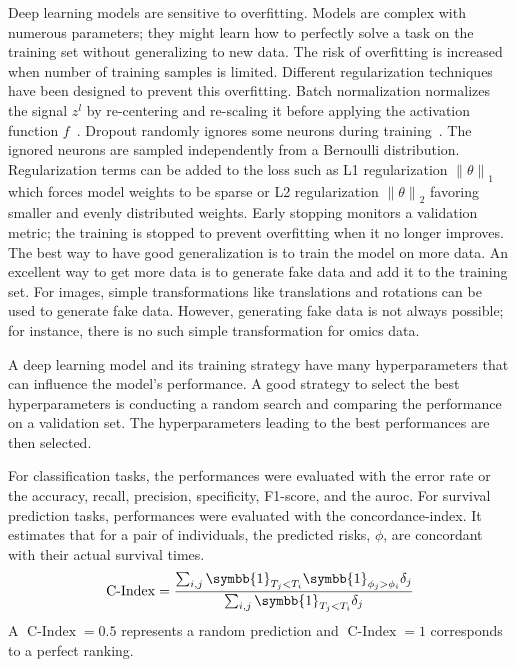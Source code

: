 \documentclass[../main.tex]{subfiles}
\begin{document}
		Deep learning models are sensitive to overfitting.
		Models are complex with numerous parameters; they might learn how to perfectly solve a task on the training set without generalizing to new data.
		The risk of overfitting is increased when number of training samples is limited.
		Different regularization techniques have been designed to prevent this overfitting.
		Batch normalization normalizes the signal \(z^{l}\) by re-centering and re-scaling it before applying the activation function \(f\)~\cite{BatchNorm}.
		Dropout randomly ignores some neurons during training~\cite{Dropout}.
		The ignored neurons are sampled independently from a Bernoulli distribution.
		Regularization terms can be added to the loss such as L1 regularization \({\|\theta\|}_{1}\) which forces model weights to be sparse or L2 regularization \({\|\theta\|}_{2}\) favoring smaller and evenly distributed weights.
		Early stopping monitors a validation metric; the training is stopped to prevent overfitting when it no longer improves.
		The best way to have good generalization is to train the model on more data.
		An excellent way to get more data is to generate fake data and add it to the training set.
		For images, simple transformations like translations and rotations can be used to generate fake data.
		However, generating fake data is not always possible; for instance, there is no such simple transformation for omics data.

		A deep learning model and its training strategy have many hyperparameters that can influence the model's performance.
		A good strategy to select the best hyperparameters is conducting a random search and comparing the performance on a validation set.
		The hyperparameters leading to the best performances are then selected.

		For classification tasks, the performances were evaluated with the error rate or the accuracy, recall, precision, specificity, F1-score, and the \gls{auroc}.
		For survival prediction tasks, performances were evaluated with the concordance-index.
		It estimates that for a pair of individuals, the predicted risks, \(\phi\),  are concordant with their actual survival times.
		\begin{equation}
			\operatorname{C-Index} = \frac{\sum_{i,j}\symbb{1}_{T_j < T_i}\symbb{1}_{\phi_j > \phi_i}\delta_j}{\sum_{i,j}\symbb{1}_{T_j < T_i}\delta_j}
		\end{equation}
		A \(\operatorname{C-Index} = 0.5\) represents a random prediction and \(\operatorname{C-Index} = 1\) corresponds to a perfect ranking.
\end{document}
